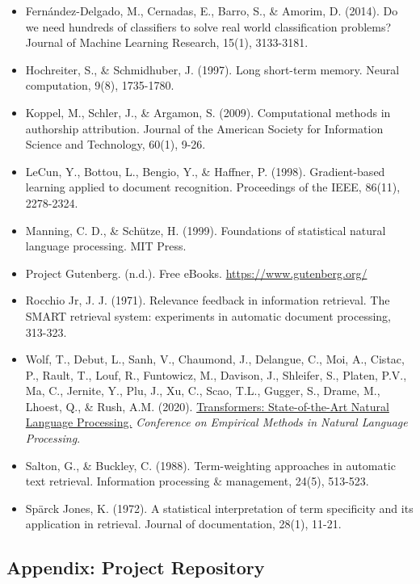 \documentclass[
]{article}
\begin{document}
\begin{itemize}
\item
  Fernández-Delgado, M., Cernadas, E., Barro, S., \& Amorim, D. (2014).
  Do we need hundreds of classifiers to solve real world classification
  problems? Journal of Machine Learning Research, 15(1), 3133-3181.
\item
  Hochreiter, S., \& Schmidhuber, J. (1997). Long short-term memory.
  Neural computation, 9(8), 1735-1780.
\item
  Koppel, M., Schler, J., \& Argamon, S. (2009). Computational methods
  in authorship attribution. Journal of the American Society for
  Information Science and Technology, 60(1), 9-26.
\item
  LeCun, Y., Bottou, L., Bengio, Y., \& Haffner, P. (1998).
  Gradient-based learning applied to document recognition. Proceedings
  of the IEEE, 86(11), 2278-2324.
\item
  Manning, C. D., \& Schütze, H. (1999). Foundations of statistical
  natural language processing. MIT Press.
\item
  Project Gutenberg. (n.d.). Free eBooks.
  \url{https://www.gutenberg.org/}
\item
  Rocchio Jr, J. J. (1971). Relevance feedback in information retrieval.
  The SMART retrieval system: experiments in automatic document
  processing, 313-323.
\item
  Wolf, T., Debut, L., Sanh, V., Chaumond, J., Delangue, C., Moi, A.,
  Cistac, P., Rault, T., Louf, R., Funtowicz, M., Davison, J., Shleifer,
  S., Platen, P.V., Ma, C., Jernite, Y., Plu, J., Xu, C., Scao, T.L.,
  Gugger, S., Drame, M., Lhoest, Q., \& Rush, A.M. (2020).
  \href{https://aclanthology.org/2020.emnlp-demos.6/}{Transformers:
  State-of-the-Art Natural Language Processing.} \emph{Conference on
  Empirical Methods in Natural Language Processing}.
\item
  Salton, G., \& Buckley, C. (1988). Term-weighting approaches in
  automatic text retrieval. Information processing \& management, 24(5),
  513-523.
\item
  Spärck Jones, K. (1972). A statistical interpretation of term
  specificity and its application in retrieval. Journal of
  documentation, 28(1), 11-21.
\end{itemize}

\subsection{Appendix: Project
Repository}\label{appendix-project-repository}
\end{document}
